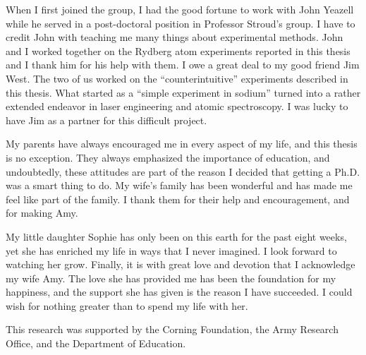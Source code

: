 When I first joined the group, I had the good fortune to work with John Yeazell
while he served in a post-doctoral position in Professor Stroud's group.  I have
to credit John with teaching me many things about experimental methods.  John
and I worked together on the Rydberg atom experiments reported in this thesis
and I thank him for his help with them.  I owe a great deal to my good friend
Jim West.  The two of us worked on the ``counterintuitive'' experiments
described in this thesis.  What started as a ``simple experiment in sodium''
turned into a rather extended endeavor in laser engineering and atomic
spectroscopy.  I was lucky to have Jim as a partner for this difficult
project.

My parents have always encouraged me in every aspect of my life, and this
thesis is no exception.  They always emphasized the importance of education,
and undoubtedly, these attitudes are part of the reason I decided that getting
a Ph.D. was a smart thing to do.  My wife's family has been wonderful and has
made me feel like part of the family.  I thank them for their help and
encouragement, and for making Amy.

My little daughter Sophie has only been on this earth for the past eight
weeks, yet she has enriched my life in ways that I never imagined. 
I look forward to watching her grow. Finally, it is with great love and devotion
that I acknowledge my wife Amy.  The love she has provided me has been the
foundation for my happiness, and the support she has given is the reason I have
succeeded.  I could wish for nothing greater than to spend my life with her.

This research was supported by the Corning Foundation, the Army Research Office,
and the Department of Education.

\newpage



